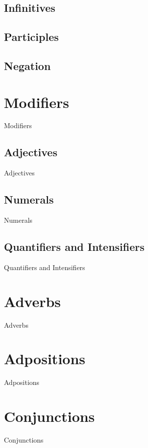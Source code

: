 \subsection{Infinitives}
\label{subsec:tvk-verb-infinitives}

\subsection{Participles}
\label{subsec:tvk-verb-participles}

\subsection{Negation}
\label{subsec:tvk-verb-negation}

\section{Modifiers}
\label{sec:tvk-modifiers}

Modifiers

\subsection{Adjectives}
\label{subsec:tvk-adjectives}

Adjectives

\subsection{Numerals}
\label{subsec:tvk-numerals}

Numerals

\subsection{Quantifiers and Intensifiers}
\label{subsec:tvk-quant-intens}

Quantifiers and Intensifiers

\section{Adverbs}
\label{sec:tvk-adverbs}

Adverbs

\section{Adpositions}
\label{sec:tvk-adpositions}

Adpositions

\section{Conjunctions}
\label{sec:tvk-conjunctions}

Conjunctions
